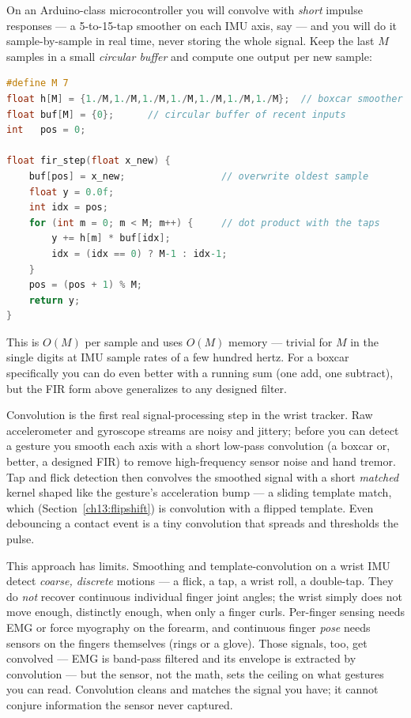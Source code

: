 \begin{buildbox}
On an Arduino-class microcontroller you will convolve with \emph{short} impulse
responses --- a 5-to-15-tap smoother on each IMU axis, say --- and you will do
it sample-by-sample in real time, never storing the whole signal. Keep the last
$M$ samples in a small \emph{circular buffer} and compute one output per new
sample:
\begin{lstlisting}[language=C, caption={Streaming FIR convolution (length-M) in C.}]
#define M 7
float h[M] = {1./M,1./M,1./M,1./M,1./M,1./M,1./M};  // boxcar smoother
float buf[M] = {0};      // circular buffer of recent inputs
int   pos = 0;

float fir_step(float x_new) {
    buf[pos] = x_new;                 // overwrite oldest sample
    float y = 0.0f;
    int idx = pos;
    for (int m = 0; m < M; m++) {     // dot product with the taps
        y += h[m] * buf[idx];
        idx = (idx == 0) ? M-1 : idx-1;
    }
    pos = (pos + 1) % M;
    return y;
}
\end{lstlisting}
This is $O(M)$ per sample and uses $O(M)$ memory --- trivial for $M$ in the
single digits at IMU sample rates of a few hundred hertz. For a boxcar
specifically you can do even better with a running sum (one add, one subtract),
but the FIR form above generalizes to any designed filter.
\end{buildbox}

\begin{goalbox}
Convolution is the first real signal-processing step in the wrist tracker. Raw
accelerometer and gyroscope streams are noisy and jittery; before you can detect
a gesture you smooth each axis with a short low-pass convolution (a boxcar or,
better, a designed FIR) to remove high-frequency sensor noise and hand tremor. Tap and flick
detection then convolves the smoothed signal with a short \emph{matched} kernel
shaped like the gesture's acceleration bump --- a sliding template match, which
(Section~\ref{ch13:flipshift}) is convolution with a flipped template. Even
debouncing a contact event is a tiny convolution that spreads and thresholds the
pulse.

This approach has limits. Smoothing and template-convolution on a
wrist IMU detect \emph{coarse, discrete} motions --- a flick, a tap, a wrist
roll, a double-tap. They do \emph{not} recover continuous individual finger
joint angles; the wrist simply does not move enough, distinctly enough, when
only a finger curls. Per-finger sensing needs EMG or force myography on the
forearm, and continuous finger \emph{pose} needs sensors on the fingers
themselves (rings or a glove). Those signals, too, get convolved --- EMG is
band-pass filtered and its envelope is extracted by convolution --- but the
sensor, not the math, sets the ceiling on what gestures you can read.
Convolution cleans and matches the signal you have; it cannot conjure
information the sensor never captured.
\end{goalbox}

